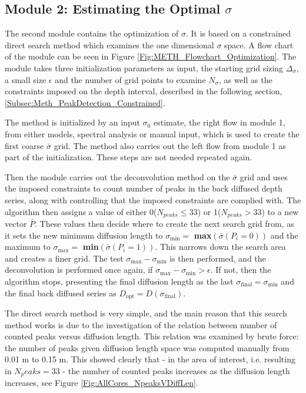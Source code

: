 \documentclass[../../CompleteThesis2/Complete_2ndDraft]{subfiles}
\begin{document}
\subsection[Module 2]{Module 2: Estimating the Optimal $\sigma$}
\label{Subsec:Method_SigmaMethod_Module2}
The second module contains the optimization of $\sigma$. It is based on a constrained direct search method which examines the one dimensional $\sigma$ space. A flow chart of the module can be seen in Figure \ref{Fig:METH_Flowchart_Optimization}. The module takes three initialization parameters as input, the starting grid sizing $\Delta_{\sigma}$, a small size $\epsilon$ and the number of grid points to examine $N_{\sigma}$, as well as the constraints imposed on the depth interval, described in the following section, \ref{Subsec:Meth_PeakDetection_Constrained}.



The method is initialized by an input $\sigma_0$ estimate, the right flow in module 1, from either models, spectral analysis or manual input, which is used to create the first coarse $\bar{\sigma}$ grid. The method also carries out the left flow from module 1 as part of the initialization. These steps are not needed repeated again.

Then the module carries out the deconvolution method on the $\bar{\sigma}$ grid and uses the imposed constraints to count number of peaks in the back diffused depth series, along with controlling that the imposed constraints are complied with. The algorithm then assigns a value of either 0($N_{peaks} \leq 33$) or 1($N_{peaks}>33$) to a new vector $\bar{P}$. These values then decide where to create the next search grid from, as it sets the new minimum diffusion length to $\sigma_{\text{min}}=$ \textbf{max}$(\bar{\sigma}(P_i=0))$ and the maximum to $\sigma_{\text{max}}=$ \textbf{min}$(\bar{\sigma}(P_i=1))$. This narrows down the search area and creates a finer grid. The test $\sigma_{\text{max}} - \sigma_{\text{min}}$ is then performed, and the deconvolution is performed once again, if $\sigma_{\text{max}} - \sigma_{\text{min}} >\epsilon$. If not, then the algorithm stops, presenting the final diffusion length as the last $\sigma_{\text{final}} = \sigma_{\text{min}}$ and the final back diffused series as $D_{\text{opt}}=D(\sigma_{\text{final}})$.

The direct search method is very simple, and the main reason that this search method works is due to the investigation of the relation between number of counted peaks versus diffusion length. This relation was examined by brute force: the number of peaks given diffusion length space was computed manually from 0.01 m to 0.15 m. This showed clearly that - in the area of interest, i.e. resulting in $N_peaks=33$ - the number of counted peaks increases as the diffusion length increases, see Figure \ref{Fig:AllCores_NpeaksVDiffLen}. 
\end{document}
